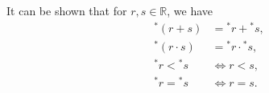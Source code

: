 It can be shown that for $r,s \in \mathbb{R}$, we have
\[
\begin{aligned}
{}^*(r+s) &= {}^*r + {}^*s, \\
{}^*(r \cdot s) &= {}^*r \cdot {}^*s, \\
{}^*r < {}^*s &\iff r < s, \\
{}^*r = {}^*s &\iff r = s.
\end{aligned}
\]






